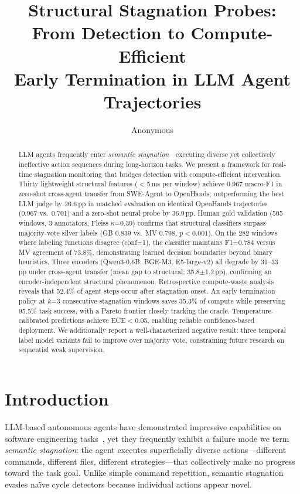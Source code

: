 \documentclass[11pt,a4paper]{article}
\title{Structural Stagnation Probes: From Detection to Compute-Efficient\\Early Termination in LLM Agent Trajectories}
\author{Anonymous}
\begin{document}
\maketitle

\begin{abstract}
LLM agents frequently enter \emph{semantic stagnation}---executing diverse yet collectively ineffective action sequences during long-horizon tasks.
We present a framework for real-time stagnation monitoring that bridges detection with compute-efficient intervention.
Thirty lightweight structural features ($<$5\,ms per window) achieve 0.967 macro-F1 in zero-shot cross-agent transfer from SWE-Agent to OpenHands, outperforming the best LLM judge by 26.6\,pp in matched evaluation on identical OpenHands trajectories (0.967 vs.\ 0.701) and a zero-shot neural probe by 36.9\,pp.
Human gold validation (505 windows, 3 annotators, Fleiss $\kappa$=0.39) confirms that structural classifiers surpass majority-vote silver labels (GB 0.839 vs.\ MV 0.798, $p<0.001$).
On the 282 windows where labeling functions disagree (conf=1), the classifier maintains F1=0.784 versus MV agreement of 73.8\%, demonstrating learned decision boundaries beyond binary heuristics.
Three encoders (Qwen3-0.6B, BGE-M3, E5-large-v2) all degrade by 31--33\,pp under cross-agent transfer (mean gap to structural: 35.8$\pm$1.2\,pp), confirming an encoder-independent structural phenomenon.
Retrospective compute-waste analysis reveals that 52.4\% of agent steps occur after stagnation onset.
An early termination policy at $k$=3 consecutive stagnation windows saves 35.3\% of compute while preserving 95.5\% task success, with a Pareto frontier closely tracking the oracle.
Temperature-calibrated predictions achieve ECE$<$0.05, enabling reliable confidence-based deployment.
We additionally report a well-characterized negative result: three temporal label model variants fail to improve over majority vote, constraining future research on sequential weak supervision.
\end{abstract}

\section{Introduction}
\label{sec:intro}

LLM-based autonomous agents have demonstrated impressive capabilities on software engineering tasks~\cite{yang2024swe,wang2024opendevin}, yet they frequently exhibit a failure mode we term \emph{semantic stagnation}: the agent executes superficially diverse actions---different commands, different files, different strategies---that collectively make no progress toward the task goal.
Unlike simple command repetition, semantic stagnation evades na\"ive cycle detectors because individual actions appear novel.
\end{document}
